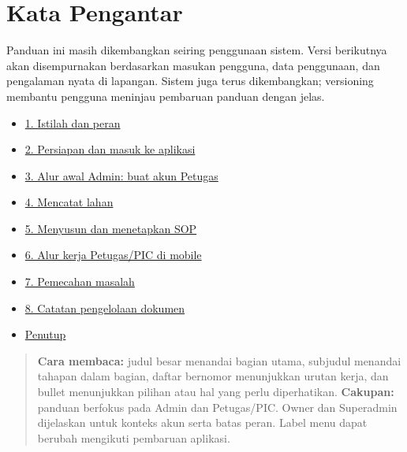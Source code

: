 \documentclass[11pt,a4paper]{article}
\begin{document}
\section{Kata Pengantar}

Panduan ini masih dikembangkan seiring penggunaan sistem. Versi berikutnya akan disempurnakan berdasarkan masukan pengguna, data penggunaan, dan pengalaman nyata di lapangan. Sistem juga terus dikembangkan; versioning membantu pengguna meninjau pembaruan panduan dengan jelas.

\begin{itemize}

\item \href{#1-istilah-dan-peran}{1. Istilah dan peran}

\item \href{#2-persiapan-dan-masuk-ke-aplikasi}{2. Persiapan dan masuk ke aplikasi}

\item \href{#3-alur-awal-admin-buat-akun-petugas}{3. Alur awal Admin: buat akun Petugas}

\item \href{#4-mencatat-lahan}{4. Mencatat lahan}

\item \href{#5-menyusun-dan-menetapkan-sop}{5. Menyusun dan menetapkan SOP}

\item \href{#6-alur-kerja-petugaspic-di-mobile}{6. Alur kerja Petugas/PIC di mobile}

\item \href{#7-pemecahan-masalah}{7. Pemecahan masalah}

\item \href{#8-catatan-pengelolaan-dokumen}{8. Catatan pengelolaan dokumen}

\item \href{#penutup}{Penutup}

\end{itemize}

\begin{quote}\small \textbf{Cara membaca:} judul besar menandai bagian utama, subjudul menandai tahapan dalam bagian, daftar bernomor menunjukkan urutan kerja, dan bullet menunjukkan pilihan atau hal yang perlu diperhatikan. \textbf{Cakupan:} panduan berfokus pada Admin dan Petugas/PIC. Owner dan Superadmin dijelaskan untuk konteks akun serta batas peran. Label menu dapat berubah mengikuti pembaruan aplikasi.\end{quote}
\end{document}
